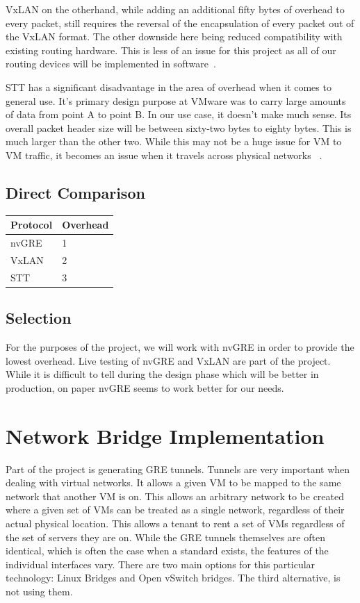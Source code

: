 \documentclass[10pt,letterpaper,onecolumn,journal]{IEEEtran}
\begin{document}
VxLAN on the otherhand, while adding an additional fifty bytes of overhead to
every packet, still requires the reversal of the encapsulation of every packet
out of the VxLAN format. The other downside here being reduced compatibility
with existing routing hardware. This is less of an issue for this project as all
of our routing devices will be implemented in software~\cite{nvgre-vs-vxlan}.

STT has a significant disadvantage in the area of overhead when it comes to
general use. It's primary design purpose at VMware was to carry large amounts of
data from point A to point B. In our use case, it doesn't make much sense. Its
overall packet header size will be between sixty-two bytes to eighty bytes. This
is much larger than the other two. While this may not be a huge issue for VM to
VM traffic, it becomes an issue when it travels across physical networks
~\cite{stt}.

\subsection{Direct Comparison}
\begin{center}
	\begin{tabular}{| l | l |}
		\hline
		Protocol & Overhead \\ \hline
		nvGRE & 1 \\ \hline
		VxLAN & 2 \\ \hline
		STT & 3 \\ \hline
	\end{tabular}
\end{center}

\subsection{Selection}
For the purposes of the project, we will work with nvGRE in order to provide the
lowest overhead. Live testing of nvGRE and VxLAN are part of the project. While
it is difficult to tell during the design phase which will be better in
production, on paper nvGRE seems to work better for our needs.


\section{Network Bridge Implementation}
Part of the project is generating GRE tunnels. Tunnels are very important when
dealing with virtual networks. It allows a given VM to be mapped to the same
network that another VM is on. This allows an arbitrary network to be created
where a given set of VMs can be treated as a single network, regardless of their
actual physical location. This allows a tenant to rent a set of VMs regardless
of the set of servers they are on. While the GRE tunnels themselves are often
identical, which is often the case when a standard exists, the features of the
individual interfaces vary. There are two main options for this particular
technology: Linux Bridges and Open vSwitch bridges. The third alternative, is
not using them.
\end{document}
